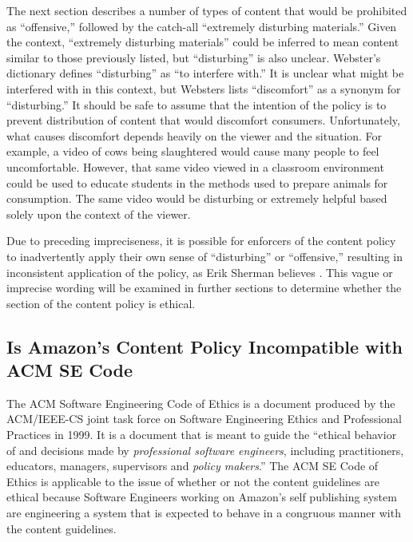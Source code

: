 \documentclass[11pt]{article}
\begin{document}
\begin{multicols}{2}
The next section describes a number of types of content that would be prohibited as ``offensive,'' followed by the catch-all ``extremely disturbing materials.'' Given the context, ``extremely disturbing materials'' could be inferred to mean content similar to those previously listed, but ``disturbing'' is also unclear.  Webster's dictionary defines ``disturbing'' as ``to interfere with.'' \cite{WebsterOnlineDict}  It is unclear what might be interfered with in this context, but Websters lists ``discomfort'' as a synonym for ``disturbing.'' \cite{WebsterOnlineDict}  It should be safe to assume that the intention of the policy is to prevent distribution of content that would discomfort consumers.  Unfortunately, what causes discomfort depends heavily on the viewer and the situation.  For example, a video of cows being slaughtered would cause many people to feel uncomfortable.  However, that same video viewed in a classroom environment could be used to educate students in the methods used to prepare animals for consumption.  The same video would be disturbing or extremely helpful based solely upon the context of the viewer. 

Due to preceding impreciseness, it is possible for enforcers of the content policy to inadvertently apply their own sense of ``disturbing'' or ``offensive,'' resulting in inconsistent application of the policy, as Erik Sherman believes \cite{ShermanAmazonExecs}.  This vague or imprecise wording will be examined in further sections to determine whether the section of the content policy is ethical.

\subsection{Is Amazon's Content Policy Incompatible with ACM SE Code}

The ACM Software Engineering Code of Ethics is a document produced by the ACM/IEEE-CS joint task force on Software Engineering Ethics and Professional Practices in 1999. \cite{SECode} It is a document that is meant to guide the ``ethical behavior of and decisions made by \emph{professional software engineers}, including practitioners, educators, managers, supervisors and \emph{policy makers}.'' \cite[Emphasis Mine]{SECode} The ACM SE Code of Ethics is applicable to the issue of whether or not the content guidelines are ethical because Software Engineers working on Amazon's self publishing system are engineering a system that is expected to behave in a congruous manner with the content guidelines. %


\end{multicols}
\end{document}
